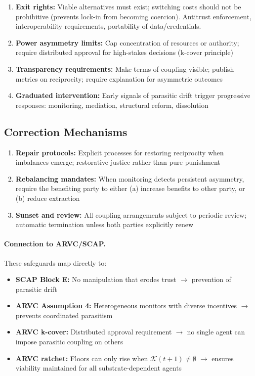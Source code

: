 \documentclass[11pt,a4paper]{article}
\begin{document}
\begin{enumerate}
    \item \textbf{Exit rights:} Viable alternatives must exist; switching costs should not be prohibitive (prevents lock-in from becoming coercion). Antitrust enforcement, interoperability requirements, portability of data/credentials.
    
    \item \textbf{Power asymmetry limits:} Cap concentration of resources or authority; require distributed approval for high-stakes decisions (k-cover principle)
    
    \item \textbf{Transparency requirements:} Make terms of coupling visible; publish metrics on reciprocity; require explanation for asymmetric outcomes
    
    \item \textbf{Graduated intervention:} Early signals of parasitic drift trigger progressive responses: monitoring, mediation, structural reform, dissolution
\end{enumerate}

\subsection{Correction Mechanisms}

\begin{enumerate}
    \item \textbf{Repair protocols:} Explicit processes for restoring reciprocity when imbalances emerge; restorative justice rather than pure punishment
    
    \item \textbf{Rebalancing mandates:} When monitoring detects persistent asymmetry, require the benefiting party to either (a) increase benefits to other party, or (b) reduce extraction
    
    \item \textbf{Sunset and review:} All coupling arrangements subject to periodic review; automatic termination unless both parties explicitly renew
\end{enumerate}

\paragraph{Connection to ARVC/SCAP.} These safeguards map directly to:
\begin{itemize}
    \item \textbf{SCAP Block E:} No manipulation that erodes trust $\to$ prevention of parasitic drift
    \item \textbf{ARVC Assumption 4:} Heterogeneous monitors with diverse incentives $\to$ prevents coordinated parasitism
    \item \textbf{ARVC k-cover:} Distributed approval requirement $\to$ no single agent can impose parasitic coupling on others
    \item \textbf{ARVC ratchet:} Floors can only rise when $\mathcal{K}(t+1) \neq \emptyset$ $\to$ ensures viability maintained for all substrate-dependent agents
\end{itemize}
\end{document}
